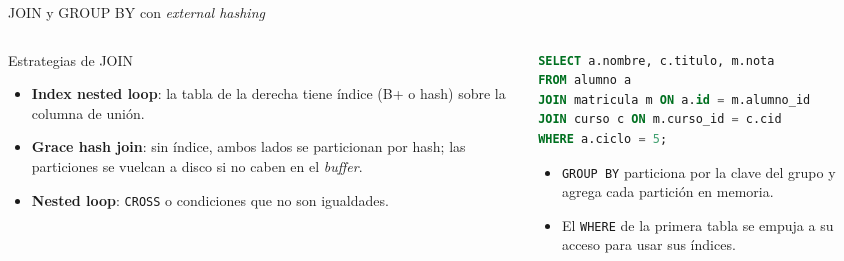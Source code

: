 \documentclass[aspectratio=169,10pt]{beamer}
\begin{document}
\begin{frame}[fragile]{JOIN y GROUP BY con \emph{external hashing}}
  \begin{columns}[T]
    \begin{column}{0.48\textwidth}
      \begin{block}{Estrategias de JOIN}
        \small
        \begin{itemize}
          \item \textbf{Index nested loop}: la tabla de la derecha tiene índice (B+ o hash) sobre la columna de unión.
          \item \textbf{Grace hash join}: sin índice, ambos lados se particionan por hash; las particiones se vuelcan a disco si no caben en el \emph{buffer}.
          \item \textbf{Nested loop}: \texttt{CROSS} o condiciones que no son igualdades.
        \end{itemize}
      \end{block}
    \end{column}
    \begin{column}{0.5\textwidth}
\begin{lstlisting}[language=SQL]
SELECT a.nombre, c.titulo, m.nota
FROM alumno a
JOIN matricula m ON a.id = m.alumno_id
JOIN curso c ON m.curso_id = c.cid
WHERE a.ciclo = 5;
\end{lstlisting}
      \small
      \begin{itemize}
        \item \texttt{GROUP BY} particiona por la clave del grupo y agrega cada partición en memoria.
        \item El \texttt{WHERE} de la primera tabla se empuja a su acceso para usar sus índices.
      \end{itemize}
    \end{column}
  \end{columns}
\end{frame}
\end{document}
